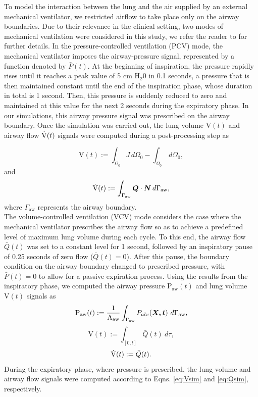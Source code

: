 \documentclass[preprint,3p,12pt,number,sort&compress]{elsarticle}
\def\vec   #1{\text{\boldmath $#1$}{}}
\begin{document}
To model the interaction between the lung and the air supplied by an external mechanical ventilator, we restricted airflow to take place only on the airway boundaries. Due to their relevance in the clinical setting, two modes of mechanical ventilation were considered in this study, we refer the reader to \cite{avileshurtado2022whole} for further details. In the pressure-controlled ventilation (PCV) mode, the mechanical ventilator imposes the airway-pressure signal, represented by a function denoted by $\bar{P}(t)$. At the beginning of inspiration, the pressure rapidly rises until it reaches a peak value of 5 cm H$_2$0 in 0.1 seconds, a pressure that is then maintained constant until the end of the inspiration phase, whose duration in total is 1 second. Then, this pressure is suddenly reduced to zero and maintained at this value for the next 2 seconds during the expiratory phase. In our simulations, this airway pressure signal was prescribed on the airway boundary. Once the simulation was carried out, the lung volume $\text{V}(t)$ and airway flow $\dot{\rm{V}}(t)$ signals were computed during a post-processing step as

\begin{equation}
    \text{V}(t):= \int_{\Omega_0} J \, d\Omega_0 - \int_{\Omega_0}  \, d\Omega_0, \label{eq:Vsim}
\end{equation}
and
\begin{equation}
    \dot{\rm{V}}(t):= \int_{\Gamma_\text{aw}} \vec Q \cdot \vec N \, d \Gamma_\text{aw},
    \label{eq:Qsim}
\end{equation}
where $\Gamma_\text{aw}$ represents the airway boundary.\\

The volume-controlled ventilation (VCV) mode considers the case where the mechanical ventilator prescribes the airway flow so as to achieve a predefined level of maximum lung volume during each cycle. To this end, the airway flow $\bar{Q}(t)$ was set to a constant level for 1 second, followed by an inspiratory pause of 0.25 seconds of zero flow ($\bar{Q}(t)=0$). After this pause, the boundary condition on the airway boundary changed to prescribed pressure, with $\bar{P}(t)=0$ to allow for a passive expiration process. Using the results from the inspiratory phase, we computed the airway pressure $\text{P}_\text{aw}(t)$ and lung volume $\text{V}(t)$ signals as
\begin{equation}
\text{P}_\text{aw}(t):=\frac{1}{\text{A}_\text{aw}}\int_{\Gamma_\text{aw}} {P}_{alv}(\vec{X,t}) \  d\Gamma_\text{aw}, \label{paw_avg}
\end{equation}
\begin{equation}
    \text{V}(t):= \int_{[0,t]} \bar{Q}(t)\ d\tau ,
\end{equation} 
\begin{equation}
    \dot{\rm{V}}(t):= \bar{Q}(t).
\end{equation}
During the expiratory phase, where pressure is prescribed, the lung volume and airway flow signals were computed according to Eqns. \eqref{eq:Vsim} and \eqref{eq:Qsim}, respectively.\\
\end{document}
